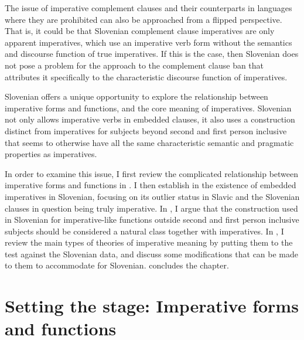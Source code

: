 \documentclass[output=paper,colorlinks,citecolor=brown]{langscibook}
\begin{document}
The issue of imperative complement clauses and their counterparts in languages where they are prohibited can also be approached from a flipped perspective. That is, it could be that Slovenian complement clause imperatives are only apparent imperatives, which use an imperative verb form without the semantics and discourse function of true imperatives. If this is the case, then Slovenian does not pose a problem for the approach to the complement clause ban that attributes it specifically to the characteristic discourse function of imperatives.   

Slovenian offers a unique opportunity to explore the relationship between imperative forms and functions, and the core meaning of imperatives. Slovenian not only allows imperative verbs in embedded clauses, it also uses a construction distinct from imperatives for subjects beyond second and first person inclusive that seems to otherwise have all the same characteristic semantic and pragmatic properties as imperatives.

In order to examine this issue, I first review the complicated relationship between imperative forms and functions in . I then establish in  the existence of embedded imperatives in Slovenian, focusing on its outlier status in Slavic and the Slovenian clauses in question being truly imperative. In , I argue that the construction used in Slovenian for imperative-like functions outside second and first person inclusive subjects should be considered a natural class together with imperatives. In , I review the main types of theories of imperative meaning by putting them to the test against the Slovenian data, and discuss some modifications that can be made to them to accommodate for Slovenian.  concludes the chapter. 
  
\section{Setting the stage: Imperative forms and functions}
\label{sec:background}
\end{document}
